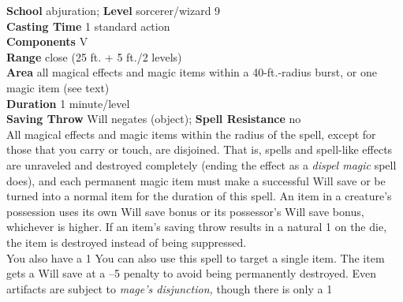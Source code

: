 \textbf{School }abjuration; \textbf{Level }sorcerer/wizard 9\\
\textbf{Casting Time }1 standard action\\
\textbf{Components }V\\
\textbf{Range }close (25 ft. + 5 ft./2 levels)\\
\textbf{Area }all magical effects and magic items within a 40-ft.-radius burst, or one magic item (see text)\\
\textbf{Duration }1 minute/level\\
\textbf{Saving Throw} Will negates (object); \textbf{Spell Resistance} no\\
All magical effects and magic items within the radius of the spell, except for those that you carry or touch, are disjoined. That is, spells and spell-like effects are unraveled and destroyed completely (ending the effect as a \textit{dispel magic }spell does), and each permanent magic item must make a successful Will save or be turned into a normal item for the duration of this spell. An item in a creature's possession uses its own Will save bonus or its possessor's Will save bonus, whichever is higher. If an item's saving throw results in a natural 1 on the die, the item is destroyed instead of being suppressed.\\
You also have a 1%
You can also use this spell to target a single item. The item gets a Will save at a –5 penalty to avoid being permanently destroyed. Even artifacts are subject to \textit{mage's disjunction, }though there is only a 1%

